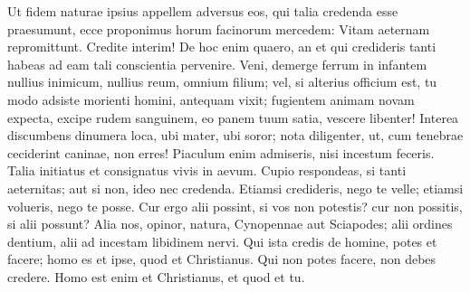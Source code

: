 Ut fidem naturae ipsius appellem adversus eos, qui talia credenda esse praesumunt, ecce proponimus horum facinorum mercedem: Vitam aeternam repromittunt. Credite interim! De hoc enim quaero, an et qui credideris tanti habeas ad eam tali conscientia pervenire. Veni, demerge ferrum in infantem nullius inimicum, nullius reum, omnium filium; vel, si alterius officium est, tu modo adsiste morienti homini, antequam vixit; fugientem animam novam expecta, excipe rudem sanguinem, eo panem tuum satia, vescere libenter! Interea discumbens dinumera loca, ubi mater, ubi soror; nota diligenter, ut, cum tenebrae ceciderint caninae, non erres! Piaculum enim admiseris, nisi incestum feceris. Talia initiatus et consignatus vivis in aevum. Cupio respondeas, si tanti aeternitas; aut si non, ideo nec credenda. Etiamsi credideris, nego te velle; etiamsi volueris, nego te posse. Cur ergo alii possint, si vos non potestis? cur non possitis, si alii possunt? Alia nos, opinor, natura, Cynopennae aut Sciapodes; alii ordines dentium, alii ad incestam libidinem nervi. Qui ista credis de homine, potes et facere; homo es et ipse, quod et Christianus. Qui non potes facere, non debes credere. Homo est enim et Christianus, et quod et tu. 

